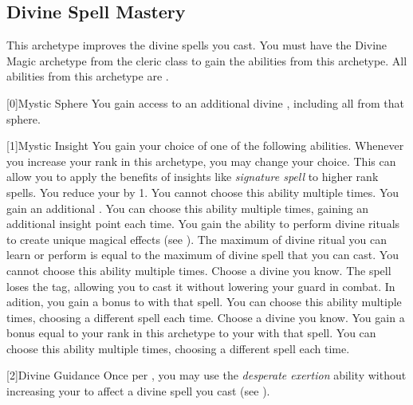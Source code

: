     \newpage
    \subsection{Divine Spell Mastery}
        This archetype improves the divine spells you cast.
        You must have the Divine Magic archetype from the cleric class to gain the abilities from this archetype.
        All abilities from this archetype are .

        [0]{Mystic Sphere} You gain access to an additional divine , including all  from that sphere.

        [1]{Mystic Insight}
        You gain your choice of one of the following abilities.
        Whenever you increase your rank in this archetype, you may change your choice.
        This can allow you to apply the benefits of insights like \textit{signature spell} to higher rank spells.
        {
             You reduce your  by 1.
                You cannot choose this ability multiple times.
             You gain an additional .
                You can choose this ability multiple times, gaining an additional insight point each time.
             You gain the ability to perform divine rituals to create unique magical effects (see ).
                The maximum  of divine ritual you can learn or perform is equal to the maximum  of divine spell that you can cast.
                You cannot choose this ability multiple times.
             Choose a divine  you know.
                The spell loses the  tag, allowing you to cast it without lowering your guard in combat.
                In adition, you gain a  bonus to  with that spell.
                You can choose this ability multiple times, choosing a different spell each time.
             Choose a divine  you know.
                You gain a bonus equal to your rank in this archetype to your  with that spell.
                You can choose this ability multiple times, choosing a different spell each time.
        }

        [2]{Divine Guidance} Once per , you may use the \textit{desperate exertion} ability without increasing your  to affect a divine spell you cast (see ).

